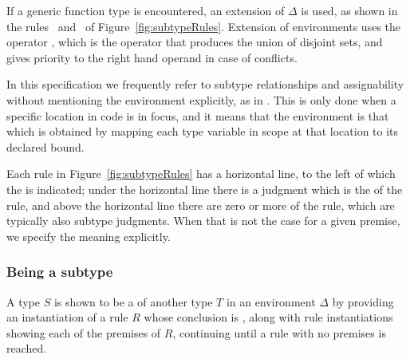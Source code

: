 \documentclass[makeidx]{article}
\begin{document}
{\LMHash{}%
If a generic function type is encountered, an extension of $\Delta$ is used,
as shown in the rules~\SrnPositionalFunctionType{}
and~\SrnNamedFunctionType{}
of Figure~\ref{fig:subtypeRules}.
Extension of environments uses the operator \Index{$\uplus$},
which is the operator that produces the union of disjoint sets,
and gives priority to the right hand operand in case of conflicts.


\LMHash{}%
In this specification we frequently refer to
subtype relationships and assignability
without mentioning the environment explicitly,
as in .
This is only done when a specific location in code is in focus,
and it means that the environment is that which is obtained
by mapping each type variable in scope at that location
to its declared bound.

\LMHash{}%
Each rule in Figure~\ref{fig:subtypeRules} has a horizontal line,
to the left of which the  is indicated;
under the horizontal line there is a judgment which is the
of the rule,
and above the horizontal line there are zero or more
of the rule,
which are typically also subtype judgments.
When that is not the case for a given premise,
we specify the meaning explicitly.



\subsubsection{Being a subtype}

\LMHash{}%
A type $S$ is shown to be a  of another type $T$
in an environment $\Delta$ by providing
an instantiation of a rule $R$ whose conclusion is
,
along with rule instantiations showing
each of the premises of $R$,
continuing until a rule with no premises is reached.

}
\end{document}
